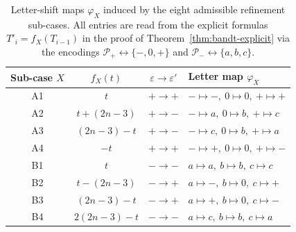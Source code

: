 \documentclass{amsart}
\theoremstyle{definition}
\theoremstyle{remark}
\begin{document}
\begin{table}[ht]
\centering
\renewcommand{\arraystretch}{1.15}
\begin{tabular}{c|c|c|l}
\hline
Sub-case $X$ & $f_X(t)$ & $\varepsilon \to \varepsilon'$
  & Letter map $\varphi_X$ \\
\hline
A1 & $t$              & $+ \to +$ & $- \mapsto -,\ 0 \mapsto 0,\ + \mapsto +$ \\
A2 & $t + (2n-3)$     & $+ \to -$ & $- \mapsto a,\ 0 \mapsto b,\ + \mapsto c$ \\
A3 & $(2n-3) - t$     & $+ \to -$ & $- \mapsto c,\ 0 \mapsto b,\ + \mapsto a$ \\
A4 & $-t$             & $+ \to +$ & $- \mapsto +,\ 0 \mapsto 0,\ + \mapsto -$ \\
B1 & $t$              & $- \to -$ & $a \mapsto a,\ b \mapsto b,\ c \mapsto c$ \\
B2 & $t - (2n-3)$     & $- \to +$ & $a \mapsto -,\ b \mapsto 0,\ c \mapsto +$ \\
B3 & $(2n-3) - t$     & $- \to +$ & $a \mapsto +,\ b \mapsto 0,\ c \mapsto -$ \\
B4 & $2(2n-3) - t$    & $- \to -$ & $a \mapsto c,\ b \mapsto b,\ c \mapsto a$ \\
\hline
\end{tabular}
\medskip
\caption{Letter-shift maps $\varphi_X$ induced by the eight
admissible refinement sub-cases.  All entries are read from the
explicit formulas $T'_i = f_X(T_{i-1})$ in the proof of
Theorem~\ref{thm:bandt-explicit} via the encodings
$\mathcal{P}_+ \leftrightarrow \{-,0,+\}$ and
$\mathcal{P}_- \leftrightarrow \{a,b,c\}$.}
\label{tab:letter-maps}
\end{table}
\end{document}
